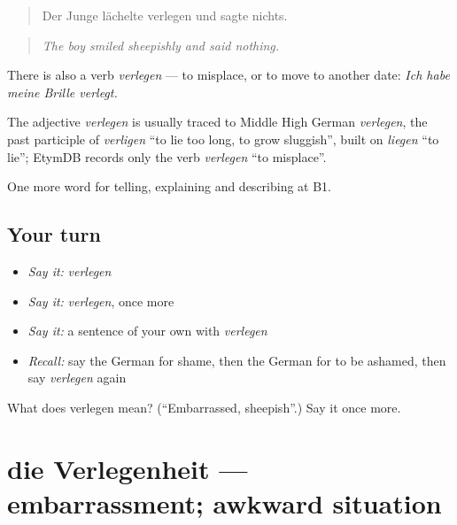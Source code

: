 \begin{quote}
Der Junge lächelte verlegen und sagte nichts.
\end{quote}

\begin{quote}
\emph{The boy smiled sheepishly and said nothing.}
\end{quote}

There is also a verb \emph{verlegen} — to misplace, or to move to another date: \emph{Ich habe meine Brille verlegt.}

\begin{cousinweb}
The adjective \emph{verlegen} is usually traced to Middle High German \emph{verlegen}, the past participle of \emph{verligen} \textquotedblleft{}to lie too long, to grow sluggish\textquotedblright{}, built on \emph{liegen} \textquotedblleft{}to lie\textquotedblright{}; EtymDB records only the verb \emph{verlegen} \textquotedblleft{}to misplace\textquotedblright{}.
\end{cousinweb}

\begin{grammarlens}[title={What you've built}]
One more word for telling, explaining and describing at B1.
\end{grammarlens}

\subsection*{Your turn}
\begin{itemize}
\raggedright
  \item \emph{Say it:} \emph{verlegen}
  \item \emph{Say it:} \emph{verlegen}, once more
  \item \emph{Say it:} a sentence of your own with \emph{verlegen}
  \item \emph{Recall:} say the German for shame, then the German for to be ashamed, then say \emph{verlegen} again
\end{itemize}

\begin{tcolorbox}[breakable,colback=teal!4,colframe=teal!35!black,title={Before you move on}]
What does verlegen mean? (\textquotedblleft{}Embarrassed, sheepish\textquotedblright{}.) Say it once more.
\end{tcolorbox}
\section[die Verlegenheit]{die Verlegenheit — embarrassment; awkward situation}

